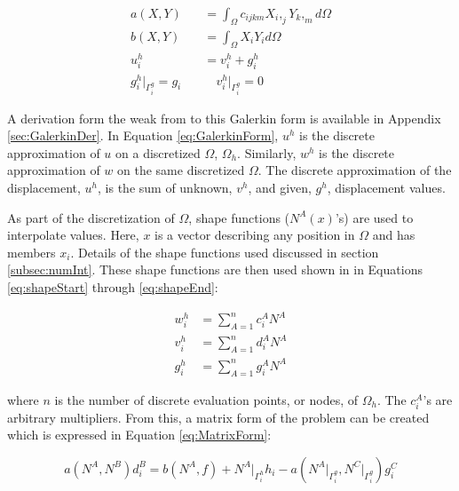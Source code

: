 \documentclass[a4paper, 12pt]{article}
\begin{document}
\begin{align} 
a( X, Y ) &= 
  \int_{\Omega} c_{ijkm} X_{i},_{j} Y_{k},_{m} d\Omega 
    \label{eq:GalerkinCont}                                           \\
b( X, Y ) &= 
  \int_{\Omega} X_{i} Y_{i} d\Omega 
    \label{eq:GalerkinForce}                                          \\
u^{h}_{i} &= 
  v^{h}_{i} + g^{h}_{i} 
  \label{eq:GalerkinUh}                                               \\
g^{h}_{i}\Big|_{\Gamma^{g}_{i}} = g_{i} 
  \quad & \quad
  v^{h}_{i}\Big|_{\Gamma^{g}_{i}} = 0
  \label{eq:GalerkinContFin}                                       %
\end{align}

\noindent
A derivation form the weak from to this Galerkin form 
is available in Appendix \ref{sec:GalerkinDer}.
In Equation \ref{eq:GalerkinForm}, $u^{h}$ is the discrete
approximation of $u$ on a discretized $\Omega$, $\Omega_h$. Similarly,
$w^{h}$ is the discrete approximation of $w$ on the same 
discretized $\Omega$. The discrete approximation of
the displacement, $u^{h}$, is the sum of unknown, $v^{h}$, 
and given, $g^{h}$, displacement values. 

As part of the discretization of $\Omega$, shape functions
($N^{A}(x)$'s) are used to interpolate values. Here, $x$
is a vector describing any position in $\Omega$ and has members $x_i$. 
Details of the shape functions used discussed in section \ref{subsec:numInt}.
These shape functions are then used shown in in Equations
\ref{eq:shapeStart} through \ref{eq:shapeEnd}:

\begin{align}
w^{h}_i &= \sum_{A=1}^{n} c^{A}_i N^{A} 
  \label{eq:shapeStart}                       \\
v^{h}_i &= \sum_{A=1}^{n} d^{A}_i N^{A} 
  \label{eq:shapeUnks}                         \\
g^{h}_i &= \sum_{A=1}^{n} g^{A}_i N^{A} 
  \label{eq:shapeEnd}
\end{align}

\noindent
where $n$ is the number of discrete evaluation points, or nodes,
of $\Omega_h$. The $c^{A}_{i}$'s are arbitrary multipliers. From this, a matrix 
form of the problem can be created which is expressed in 
Equation \ref{eq:MatrixForm}:

\begin{equation} \label{eq:MatrixForm}
a( N^A, N^B) d^{B}_{i} = 
  b( N^A, f) +
  N^A\Big|_{\Gamma_{i}^{h}} h_i -
  a( N^A\Big|_{\Gamma_{i}^{g}} , N^C\Big|_{\Gamma_{i}^{g}} ) g_{i}^C
\end{equation} 
\end{document}
